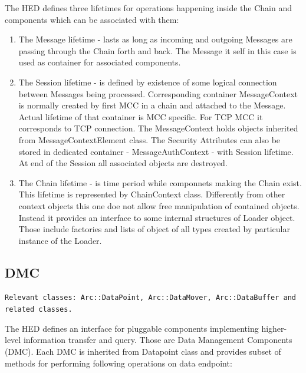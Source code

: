 \documentclass{book}
\begin{document}
The HED defines three lifetimes for operations happening inside the Chain and components which can be associated with them:


\begin{enumerate}

\item The Message lifetime - lasts as long as incoming and outgoing Messages are passing through the Chain forth and back. The Message it self in this case is used as container for associated components.

\item The Session lifetime - is defined by existence of some logical connection between Messages being processed. Corresponding container MessageContext is normally created by first MCC in a chain and attached to the Message. Actual lifetime of that container is MCC specific. For TCP MCC it corresponds to TCP connection. The MessageContext holds objects inherited from MessageContextElement class. The Security Attributes can also be stored in dedicated container - MessageAuthContext - with Session lifetime. At end of  the Session all associated objects are destroyed.

\item The Chain lifetime - is time period while componnets making the Chain exist. This lifetime is represented by ChainContext class. Differently from other context objects this one doe not allow free manipulation of contained objects. Instead it provides an interface to some internal structures of Loader object. Those include factories and lists of object of all types created by particular instance of the Loader.

\end{enumerate}


\subsection{DMC}

\texttt{Relevant classes: Arc::DataPoint, Arc::DataMover, Arc::DataBuffer and related classes.}

The HED defines an interface for pluggable components implementing higher-level information transfer and query. Those are Data Management Components (DMC). Each DMC is inherited from Datapoint class and provides subset of methods for performing following operations on data endpoint:
\end{document}
